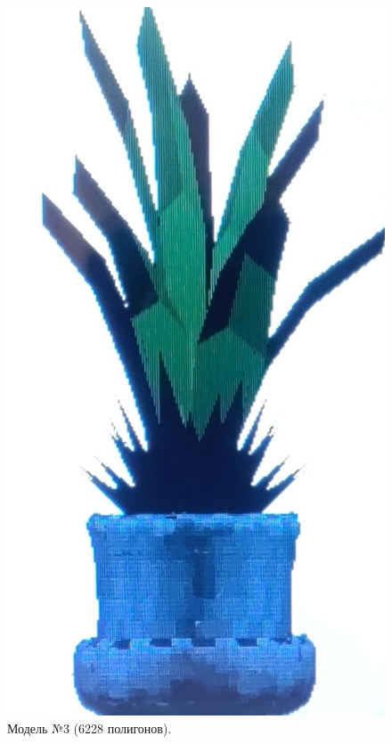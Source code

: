 \begin{figure}[h]
	\centering
	\vspace*{-9.5cm}\includegraphics[scale=0.2 ]{img/models/plant.jpg}
	\caption{Модель №3 (6228 полигонов).}
	\label{fig:warnock_identification}
\end{figure}
